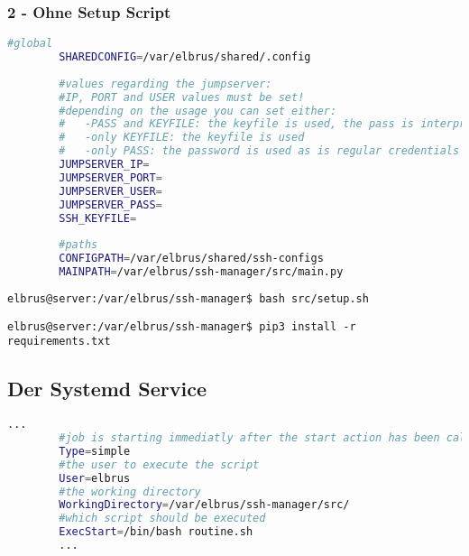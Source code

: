 	\subsubsection{2 - Ohne Setup Script}
	
	\lstset{style=files}
	\begin{lstlisting}[caption={Anhand von '.env.example' eigene '.env' Datei anlegen.}, language=bash]
		#global
		SHAREDCONFIG=/var/elbrus/shared/.config
		
		#values regarding the jumpserver:
		#IP, PORT and USER values must be set!
		#depending on the usage you can set either:
		#   -PASS and KEYFILE: the keyfile is used, the pass is interpreted as the passphrase
		#   -only KEYFILE: the keyfile is used
		#   -only PASS: the password is used as is regular credentials
		JUMPSERVER_IP=
		JUMPSERVER_PORT=
		JUMPSERVER_USER=
		JUMPSERVER_PASS=
		SSH_KEYFILE=
		
		#paths
		CONFIGPATH=/var/elbrus/shared/ssh-configs
		MAINPATH=/var/elbrus/ssh-manager/src/main.py
	\end{lstlisting}
	
	\lstset{style=commands}	
	\begin{lstlisting}[caption={Ausführen des Scripts zur Initialisierung des VCS Verzeichnisses.}]
		elbrus@server:/var/elbrus/ssh-manager$ bash src/setup.sh
	\end{lstlisting}
	
	\lstset{style=commands}
	\begin{lstlisting}[caption={Installieren von fehlenden python3 Packages.}]
		elbrus@server:/var/elbrus/ssh-manager$ pip3 install -r requirements.txt
	\end{lstlisting}
	\newpage
	
	\subsection[systemd service]{Der Systemd Service}
	
	\lstset{style=files}
	\begin{lstlisting}[caption={ssh-manager.service.example - Die Variable 'WorkingDirectory' sowie die Variable 'User' anpassen.},language=bash ,keywords={WorkingDirectory, User}, keywordstyle=\color{red}, firstnumber=5]
		...
		#job is starting immediatly after the start action has been called
		Type=simple
		#the user to execute the script
		User=elbrus
		#the working directory
		WorkingDirectory=/var/elbrus/ssh-manager/src/
		#which script should be executed
		ExecStart=/bin/bash routine.sh
		...
	\end{lstlisting}
	
